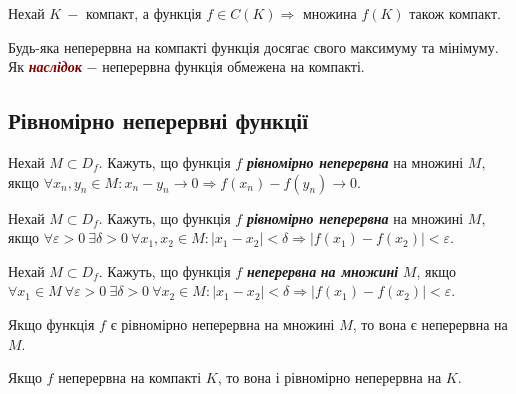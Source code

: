 \begin{theorem}
       Нехай $K \: -$ компакт, а функція $f \in C(K) \Rightarrow$ множина $f(K)$ також компакт.
\end{theorem}

\begin{theorem}
       Будь-яка неперервна на компакті функція досягає свого максимуму та мінімуму. Як \textcolor{Maroon}{\textbf{\textit{{{наслідок}}}}} $-$ неперервна функція обмежена на компакті.
\end{theorem}

\subsection{\large{Рівномірно неперервні функції}} 

\begin{definition}[за Гейне]
         Нехай $M \subset D_f$. Кажуть, що функція $f$ \textcolor{NavyBlue}{\textbf{\textit{{рівномірно неперервна}}}} на множині $M$, якщо  $\forall  x_n, y_n \in M: x_n - y_n \to 0 \Rightarrow f(x_n) - f(y_n) \to 0$. 
\end{definition}

\begin{definition}[за Коші]
       Нехай $M \subset D_f$. Кажуть, що функція $f$ \textcolor{NavyBlue}{\textbf{\textit{{рівномірно неперервна}}}} на множині $M$, якщо  $\forall \varepsilon > 0 \ \exists \delta > 0 \ \forall x_1, x_2 \in M: |x_1 - x_2| < \delta \Rightarrow |f(x_1) - f(x_2)| < \varepsilon$.   
\end{definition}

\begin{definition}[за Коші]
        Нехай $M \subset D_f$. Кажуть, що функція $f$  \textcolor{NavyBlue}{\textbf{\textit{{неперервна}}}} \textcolor{NavyBlue}{\textbf{\textit{{на множині}}}} $M$, \newline якщо  $\forall x_1 \in M \ \forall \varepsilon > 0 \ \exists \delta > 0 \ \forall x_2 \in M: |x_1 - x_2| < \delta \Rightarrow |f(x_1) - f(x_2)| < \varepsilon$.   
\end{definition}

\begin{theorem}
        Якщо функція $f$ є рівномірно неперервна на множині $M$, то вона є неперервна на $M$.       
\end{theorem}

\begin{theorem}
        Якщо $f$ неперервна на компакті $K$, то вона і рівномірно неперервна на $K$.
\end{theorem}

